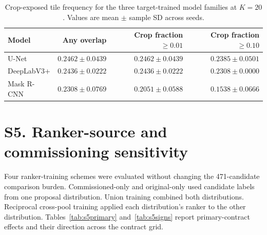 \documentclass[preprint,12pt]{elsarticle}
\begin{document}
\begin{table}[htbp]
\centering
\caption{Crop-exposed tile frequency for the three target-trained model families at $K=20$. Values are mean $\pm$ sample SD across seeds.}
\label{tab:s4cropmodels}
\footnotesize
\setlength{\tabcolsep}{4pt}
\begin{tabular}{lrrr}
\toprule
Model & Any overlap & \shortstack{Crop fraction\\$\ge0.01$} & \shortstack{Crop fraction\\$\ge0.10$} \\
\midrule
U-Net & $0.2462\pm0.0439$ & $0.2462\pm0.0439$ & $0.2385\pm0.0501$ \\
DeepLabV3+ & $0.2436\pm0.0222$ & $0.2436\pm0.0222$ & $0.2308\pm0.0000$ \\
Mask R-CNN & $0.2308\pm0.0769$ & $0.2051\pm0.0588$ & $0.1538\pm0.0666$ \\
\bottomrule
\end{tabular}
\end{table}

\section{S5. Ranker-source and commissioning sensitivity}

Four ranker-training schemes were evaluated without changing the 471-candidate comparison burden. Commissioned-only and original-only used candidate labels from one proposal distribution. Union training combined both distributions. Reciprocal cross-pool training applied each distribution's ranker to the other distribution. Tables~\ref{tab:s5primary} and~\ref{tab:s5signs} report primary-contract effects and their direction across the contract grid.
\end{document}
